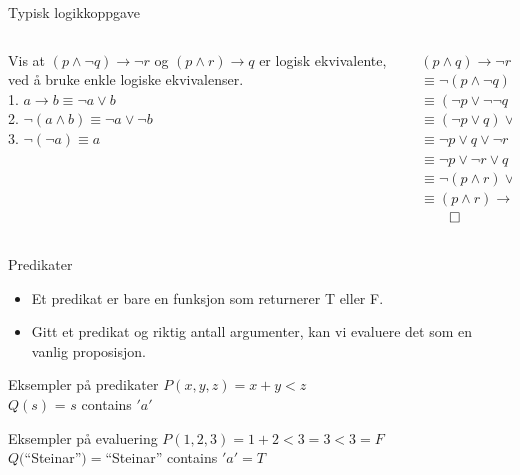 \begin{frame}{Typisk logikkoppgave}
    \begin{columns}
    \begin{column}{0.48\textwidth}
        Vis at $(p \land \lnot q) \rightarrow \lnot r$ og $(p \land r) \rightarrow q$ er logisk ekvivalente, ved å bruke enkle logiske ekvivalenser.\\[1cm]
        1. $a \rightarrow b \equiv \lnot a \lor b$ \\
        2. $\lnot (a \land b) \equiv \lnot a \lor \lnot b$\\
        3. $\lnot (\lnot a) \equiv a$
    \end{column}
    \begin{column}{0.48\textwidth}
            \pause
            $(p \land q) \rightarrow \lnot r$ \\
            \pause
            $\equiv \lnot (p \land \lnot q) \lor \lnot r$ \\
            \pause
            $\equiv (\lnot p \lor \lnot \lnot q) \lor \lnot r$ \\
            \pause
            $\equiv (\lnot p \lor q) \lor \lnot r$ \\
            \pause
            $\equiv \lnot p \lor q \lor \lnot r$ \\
            \pause
            $\equiv \lnot p \lor \lnot r \lor q$ \\
            \pause
            $\equiv \lnot (p \land r) \lor q$ \\
            \pause
            $\equiv (p \land r) \rightarrow q$
            $\qed$
    \end{column}
    \end{columns}
\end{frame}

\begin{frame}{Predikater}
    \begin{itemize}
        \item Et predikat er bare en funksjon som returnerer T eller F.
        \item Gitt et predikat og riktig antall argumenter, kan vi evaluere det som en vanlig proposisjon.
    \end{itemize}
    \begin{block}{Eksempler på predikater}
        $P(x, y, z) = x + y < z$\\
        $Q(s)$ = $s$ contains $'a'$
    \end{block}
    \pause
    \begin{block}{Eksempler på evaluering}
        $P(1, 2, 3) = 1 + 2 < 3 = 3 < 3 = F$ \\ 
        $Q($\enquote{Steinar}$) = $\enquote{Steinar} contains $'a' = T$
    \end{block}

\end{frame}

